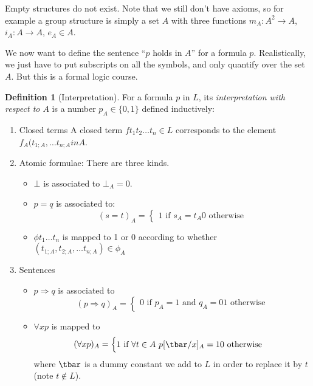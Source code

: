 \documentclass{article}
\theoremstyle{definition}
\newtheorem{definition}{Definition}
\numberwithin{definition}{section}
\begin{document}
Empty structures do not exist. 
Note that we still don't have axioms, so for example a group structure is 
simply a set $A$ with three functions $m_{A}: A^{2} \to A$, 
$i_{A} : A \to A$, $e_{A} \in A$.

We now want to define the sentence ``$p$ holds in $A$'' for a formula $p$.
Realistically, we just have to put subscripts on all the symbols, 
and only quantify over the set $A$. But this is a formal logic course. 

\begin{definition}[Interpretation]
  For a formula $p$ in $L$, its \textit{interpretation with respect to $A$} 
  is a number $p_{A} \in \{0,1\}$ defined inductively:

  \begin{enumerate}[i]
  \item Closed terms
    A closed term $f t_{1} t_{2} \ldots t_{n}  \in L$ corresponds to the 
      element $f_{A}(t_{1;A}, \ldots t_{n;A} in A$.

  \item Atomic formulae: There are three kinds. 
    \begin{itemize}
        \item $\bot$ is associated to $\bot_{A} = 0$.
        \item $p=q$ is associated to:
            $$(s = t)_{A} = 
              \begin{cases}
                1 \text{ if $s_{A} = t_{A}$} 
                0 \text{ otherwise}
              \end{cases}
            $$
        \item $\phi t_{1} \ldots t_{n}$ is mapped to 1 or 0 according to 
            whether $(t_{1;A},t_{2;A},\ldots t_{n;A}) \in \phi_{A}$
            
    \end{itemize}
  \item Sentences
      \begin{itemize}
        \item $p \Rightarrow q$ is associated to
            $$(p \Rightarrow q)_{A} = 
              \begin{cases}
                0 \text{ if $p_{A} = 1$ and $q_{A} = 0$} 
                1 \text{ otherwise}
              \end{cases}
            $$
        \item $\forall x p$ is mapped to 
            $$(\forall x p)_{A} = 
              \begin{cases}
                1 \text{ if $\forall t \in A$ $p[\tbar/x]_{A} = 1$}
                0 \text{ otherwise}
              \end{cases}
            $$
        where $\tbar$ is a dummy constant we add to $L$ 
          in order to replace it by $t$ (note $t \notin L$).
      \end{itemize}
  \end{enumerate}
\end{definition}
\end{document}
